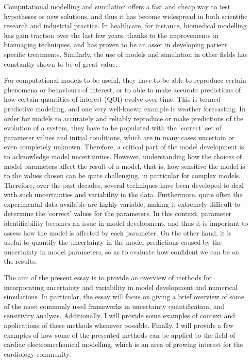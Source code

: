 \documentclass[12pt]{article}
\begin{document}
Computational modelling and simulation offers a fast and cheap way to test hypotheses or new solutions, and thus it has become widespread in both scientific research and industrial practice. In healthcare, for instance, biomedical modelling has gain traction over the last few years, thanks to the improvements in bioimaging techniques, and has proven to be an asset in developing patient specific treatments. Similarly, the use of models and simulation in other fields has constantly shown to be of great value.
 
For computational models to be useful, they have to be able to reproduce certain phenomena or behaviours of interest, 
or to able to make accurate predictions of how certain quantities of interest (QOI) evolve over time. This is termed predictive modelling, and one very well-known example is weather forecasting. In order for models to accurately and reliably reproduce or make predictions of the evolution of a system, they have to be populated with the 'correct' set of parameter values and initial conditions, which are in many cases uncertain or even completely unknown. %
 Therefore, a critical part of the model development is to acknowledge model uncertainties.  However, understanding how the choices of model parameters affect the result of a model, that is, how sensitive the model is to the values chosen can be quite challenging, in particular for complex models. Therefore, over the past decades, several techniques have been developed to deal with such uncertainties and variability in the data.
Furthermore, quite often the experimental data available are highly variable, making it extremely difficult to determine the `correct' values for the parameters. 
In this context, parameter identifiability becomes an issue in model development, and thus it is important to assess how the model is affected by each parameter. On the other hand, it is useful to quantify the uncertainty in the model predictions caused by the uncertainty in model parameters, so as to evaluate how confident we can be on the results.

The aim of the present essay is to provide an overview of methods for incorporating uncertainty and variability in model development and numerical simulations. In particular, the essay will focus on giving a brief overview of some of the most commonly used frameworks in uncertainty quantification, and sensitivity analysis. Additionally, I will provide some examples of context and applications of these methods whenever possible. Finally, I will provide a few examples of how some of the presented methods can be applied to the field of cardiac electromechanical modelling, which is an area of growing interest for the cardiology community. 
 
\end{document}

